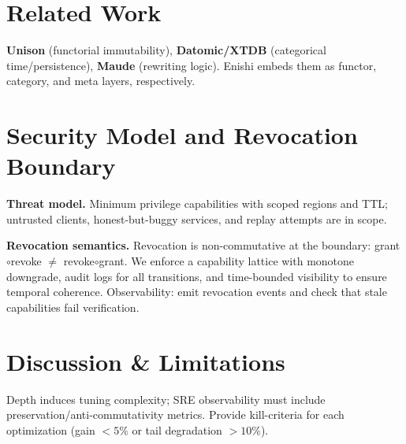 \documentclass[10pt]{article}
\begin{document}
\section{Related Work}
\textbf{Unison} (functorial immutability), \textbf{Datomic/XTDB} (categorical time/persistence),
\textbf{Maude} (rewriting logic). Enishi embeds them as functor, category, and meta layers, respectively.

\section{Security Model and Revocation Boundary}\label{sec:security}
\textbf{Threat model.} Minimum privilege capabilities with scoped regions and TTL; untrusted clients, honest-but-buggy services, and replay attempts are in scope.

\textbf{Revocation semantics.} Revocation is non-commutative at the boundary: grant$\circ$revoke $\ne$ revoke$\circ$grant. We enforce a capability lattice with monotone downgrade, audit logs for all transitions, and time-bounded visibility to ensure temporal coherence. Observability: emit revocation events and check that stale capabilities fail verification.

\section{Discussion \& Limitations}
Depth induces tuning complexity; SRE observability must include preservation/anti-commutativity metrics.
Provide kill-criteria for each optimization (gain $<\!5\%$ or tail degradation $>\!10\%$).
\end{document}
